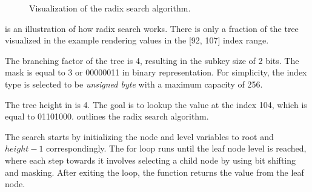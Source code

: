 \begin{figure}[!ht]

    \caption{Visualization of the radix search algorithm.}
    \label{fig:rb-tree-example-1}
\end{figure}

 is an illustration of how radix search works. There is only a fraction of the tree visualized in the example rendering values in the [92, 107] index range.

The branching factor of the tree is 4, resulting in the subkey size of 2 bits. The mask is equal to 3 or 00000011 in binary representation. For simplicity, the index type is selected to be \emph{unsigned byte} with a maximum capacity of 256.

The tree height in  is 4. The goal is to lookup the value at the index 104, which is equal to 01101000.  outlines the radix search algorithm.

The search starts by initializing the node and level variables to root and $height - 1$ correspondingly. The for loop runs until the leaf node level is reached, where each step towards it involves selecting a child node by using bit shifting and masking. After exiting the loop, the function returns the value from the leaf node.

